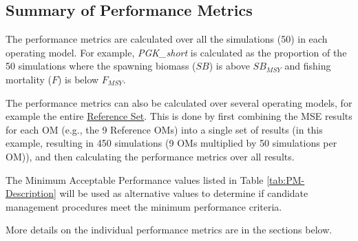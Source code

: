 \documentclass[
]{article}
\begin{document}
\hypertarget{summary-of-performance-metrics}{%
\subsection{Summary of Performance Metrics}\label{summary-of-performance-metrics}}

The performance metrics are calculated over all the simulations (50) in each operating model. For example, \emph{PGK\_short} is calculated as the proportion of the 50 simulations where the spawning biomass (\(SB\)) is above \(SB_{MSY}\) and fishing mortality (\(F\)) is below \(F_{MSY}\).

The performance metrics can also be calculated over several operating models, for example the entire \protect\hyperlink{reference_models}{Reference Set}. This is done by first combining the MSE results for each OM (e.g., the 9 Reference OMs) into a single set of results (in this example, resulting in 450 simulations (9 OMs multiplied by 50 simulations per OM)), and then calculating the performance metrics over all results.

The Minimum Acceptable Performance values listed in Table \ref{tab:PM-Description} will be used as alternative values to determine if candidate management procedures meet the minimum performance criteria.

More details on the individual performance metrics are in the sections below.
\end{document}
